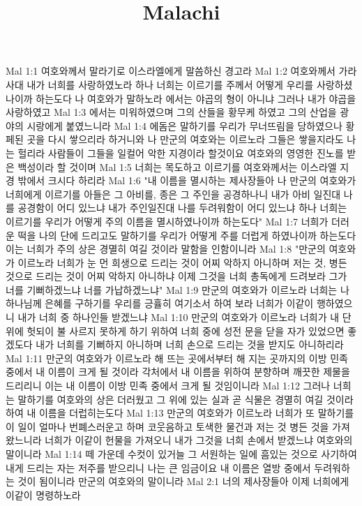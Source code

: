 

\title{Malachi}

Mal 1:1  여호와께서 말라기로 이스라엘에게 말씀하신 경고라
Mal 1:2  여호와께서 가라사대 내가 너희를 사랑하였노라 하나 너희는 이르기를 주께서 어떻게 우리를 사랑하셨나이까 하는도다 나 여호와가 말하노라 에서는 야곱의 형이 아니냐 그러나 내가 야곱을 사랑하였고
Mal 1:3  에서는 미워하였으며 그의 산들을 황무케 하였고 그의 산업을 광야의 시랑에게 붙였느니라
Mal 1:4  에돔은 말하기를 우리가 무너뜨림을 당하였으나 황페된 곳을 다시 쌓으리라 하거니와 나 만군의 여호와는 이르노라 그들은 쌓을지라도 나는 헐리라 사람들이 그들을 일컬어 악한 지경이라 할것이요 여호와의 영영한 진노를 받은 백성이라 할 것이며
Mal 1:5  너희는 목도하고 이르기를 여호와께서는 이스라엘 지경 밖에서 크시다 하리라
Mal 1:6  "내 이름을 멸시하는 제사장들아 나 만군의 여호와가 너희에게 이르기를 아들은 그 아비를, 종은 그 주인을 공경하나니 내가 아비 일진대 나를 공경함이 어디 있느냐 내가 주인일진대 나를 두려워함이 어디 있느냐 하나 너희는 이르기를 우리가 어떻게 주의 이름을 멸시하였나이까 하는도다"
Mal 1:7  너희가 더러운 떡을 나의 단에 드리고도 말하기를 우리가 어떻게 주를 더럽게 하였나이까 하는도다 이는 너희가 주의 상은 경멸히 여길 것이라 말함을 인함이니라
Mal 1:8  "만군의 여호와가 이르노라 너희가 눈 먼 희생으로 드리는 것이 어찌 악하지 아니하며 저는 것, 병든 것으로 드리는 것이 어찌 악하지 아니하냐 이제 그것을 너희 총독에게 드려보라 그가 너를 기뻐하겠느냐 너를 가납하겠느냐"
Mal 1:9  만군의 여호와가 이르노라 너희는 나 하나님께 은혜를 구하기를 우리를 긍휼히 여기소서 하여 보라 너희가 이같이 행하였으니 내가 너희 중 하나인들 받겠느냐
Mal 1:10  만군의 여호와가 이르노라 너희가 내 단 위에 헛되이 불 사르지 못하게 하기 위하여 너희 중에 성전 문을 닫을 자가 있었으면 좋겠도다 내가 너희를 기뻐하지 아니하며 너희 손으로 드리는 것을 받지도 아니하리라
Mal 1:11  만군의 여호와가 이르노라 해 뜨는 곳에서부터 해 지는 곳까지의 이방 민족 중에서 내 이름이 크게 될 것이라 각처에서 내 이름을 위하여 분향하며 깨끗한 제물을 드리리니 이는 내 이름이 이방 민족 중에서 크게 될 것임이니라
Mal 1:12  그러나 너희는 말하기를 여호와의 상은 더러웠고 그 위에 있는 실과 곧 식물은 경멸히 여길 것이라 하여 내 이름을 더럽히는도다
Mal 1:13  만군의 여호와가 이르노라 너희가 또 말하기를 이 일이 얼마나 번폐스러운고 하며 코웃음하고 토색한 물건과 저는 것 병든 것을 가져왔느니라 너희가 이같이 헌물을 가져오니 내가 그것을 너희 손에서 받겠느냐 여호와의 말이니라
Mal 1:14  떼 가운데 수컷이 있거늘 그 서원하는 일에 흠있는 것으로 사기하여 내게 드리는 자는 저주를 받으리니 나는 큰 임금이요 내 이름은 열방 중에서 두려워하는 것이 됨이니라 만군의 여호와의 말이니라
Mal 2:1  너의 제사장들아 이제 너희에게 이같이 명령하노라
